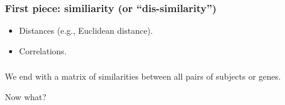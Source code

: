 
\begin{frame}
\frametitle{First piece: similiarity (or ``dis-similarity'')}
\begin{itemize}
\item Distances (e.g., Euclidean distance).
\item Correlations.
\end{itemize}
\end{frame}


\begin{frame}
  \textblockcolour{}
\end{frame}



\begin{frame}
\frametitle{}

We end with a matrix of similarities between all pairs of subjects or genes.

\vspace*{14pt}
Now what?



\end{frame}



